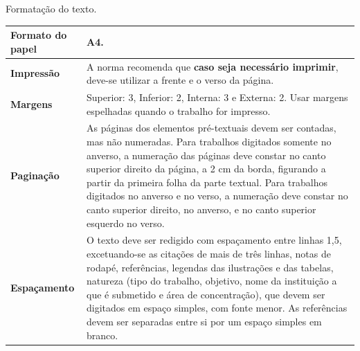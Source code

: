 \begin{quadro}[htb]
	\centering
	\caption{\label{qua:Quadro_1}Formatação do texto.}
	\begin{tabular}{|l|p{11cm}|}
		\hline
		\textbf{Formato do papel} & A4.                                                                                                                                                                                                                                                                                                                                                                                                                                 \\ \hline
		\textbf{Impressão}        & A norma recomenda que \textbf{caso seja necessário imprimir}, deve-se utilizar a frente e o verso da página.                                                                                                                                                                                                                                                                                                                        \\ \hline
		\textbf{Margens}          & Superior: 3, Inferior: 2, Interna: 3 e Externa: 2. Usar margens espelhadas quando o  trabalho for impresso.                                                                                                                                                                                                                                                                                                                         \\ \hline
		\textbf{Paginação}        & As páginas dos elementos pré-textuais devem ser contadas, mas não numeradas. Para trabalhos digitados somente no anverso, a numeração das páginas deve constar no canto superior direito da página, a 2 cm da borda, figurando a partir da primeira folha da  parte textual. Para trabalhos digitados no anverso e no verso, a numeração deve constar no canto superior direito, no anverso, e no canto superior esquerdo no verso. \\ \hline
		\textbf{Espaçamento}      & O texto deve ser redigido com espaçamento entre linhas 1,5, excetuando-se as citações de mais de três linhas, notas de rodapé, referências, legendas das ilustrações e das tabelas, natureza (tipo do trabalho, objetivo, nome da instituição a que é submetido e área de concentração), que devem ser digitados em espaço simples, com fonte menor. As referências devem ser separadas entre si por um espaço simples em branco.   \\ \hline

\end{tabular}
\end{quadro}

